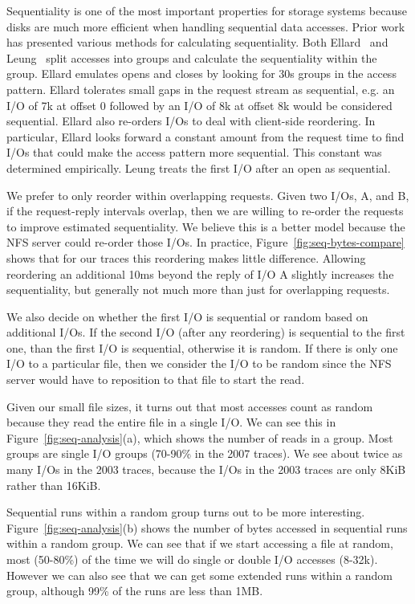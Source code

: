 Sequentiality is one of the most important properties for storage
systems because disks are much more efficient when handling sequential
data accesses.  Prior work has presented
various methods for calculating sequentiality.  Both
Ellard~\cite{EllardFast03} and Leung~\cite{LeungUsenix08} split accesses
into groups and calculate the sequentiality within the group.  Ellard
emulates opens and closes by looking for 30s groups in the access
pattern.  Ellard tolerates small gaps in the request stream as
sequential, e.g. an I/O of 7k at offset 0 followed by an I/O of 8k at
offset 8k would be considered sequential.  Ellard also re-orders I/Os
to deal with client-side reordering. In particular, Ellard looks
forward a constant amount from the request time to find I/Os that
could make the access pattern more sequential.  This constant was
determined empirically.  Leung treats the first I/O after an open as
sequential.

We prefer to only reorder within overlapping requests. Given two I/Os,
A, and B, if the request-reply intervals overlap, then we are willing
to re-order the requests to improve estimated sequentiality.  We
believe this is a better model because the NFS server could 
re-order those I/Os.  In practice,
Figure~\ref{fig:seq-bytes-compare} shows that for our traces this
reordering makes little difference.  Allowing reordering an additional
10ms beyond the reply of I/O A slightly increases the sequentiality,
but generally not much more than just for overlapping requests.

We also decide on whether the first I/O is sequential or random based
on additional I/Os.  If the second I/O (after any reordering) is
sequential to the first one, than the first I/O is sequential,
otherwise it is random.  If there is only one I/O to a particular
file, then we consider the I/O to be random since the NFS server would
have to reposition to that file to start the read.  

Given our small file sizes, it turns out that most accesses count as
random because they read the entire file in a single I/O.  We can see
this in Figure~\ref{fig:seq-analysis}(a), which shows the number of
reads in a group.  Most groups are single I/O groups (70-90\% in the
2007 traces).  We see about twice as many I/Os in the 2003 traces,
because the I/Os in the 2003 traces are only 8KiB rather than 16KiB.

Sequential runs within a random group turns out to be more
interesting.  Figure~\ref{fig:seq-analysis}(b) shows the number of
bytes accessed in sequential runs within a
random group.  We can see that if we start accessing a file at random,
most (50-80\%) of the time we will do single or double I/O accesses (8-32k).
However we can also see that we can get some extended runs within a
random group, although 99\% of the runs are less than 1MB.


